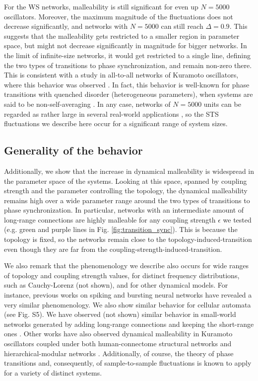 For the WS networks, malleability is still significant for even up $N = 5000$ oscillators. Moreover, the maximum magnitude of the fluctuations does not decrease significantly, and networks with $N = 5000$ can still reach $\Delta = 0.9$. This suggests that the malleability gets restricted to a smaller region in parameter space, but might not decrease significantly in magnitude for bigger networks. In the limit of infinite-size networks, it would get restricted to a single line, defining the two types of transitions to phase synchronization, and remain non-zero there. This is consistent with a study in all-to-all networks of Kuramoto oscillators, where this behavior was observed \cite{hong2006anomalous}. In fact, this behavior is well-known for phase transitions with quenched disorder (heterogeneous parameters), when systems are said to be non-self-averaging \cite{wiseman1995lack}.  
In any case, networks of $N = 5000$ units can be regarded as rather large in several real-world applications \cite{peter2018transition}, so the STS fluctuations we describe here occur for a significant range of system sizes.

\subsection{Generality of the behavior}
Additionally, we show that the increase in dynamical malleability is widespread in the parameter space of the systems. Looking at this space, spanned by coupling strength and the parameter controlling the topology, the dynamical malleability remains high over a wide parameter range around the two types of transitions to phase synchronization. In particular, networks with an intermediate amount of long-range connections are highly malleable for any coupling strength $\epsilon$ we tested (e.g. green and purple lines in Fig. \ref{fig:transition_sync}). This is because the topology is fixed, so the networks remain close to the topology-induced-transition even though they are far from the coupling-strength-induced-transition. 

We also remark that the phenomenology we describe also occurs for wide ranges of topology and coupling strength values, for distinct frequency distributions, such as Cauchy-Lorenz (not shown), and for other dynamical models. For instance, previous works on spiking \cite{budzinski2020synchronization} and bursting \cite{budzinski2019synchronous} neural networks have revealed a very similar phenomenology. We also show similar behavior for cellular automata (see Fig. S5). We have observed (not shown) similar behavior in small-world networks generated by adding long-range connections and keeping the short-range ones \cite{newman1999scaling}. Other works have also observed dynamical malleability in Kuramoto oscillators coupled under both human-connectome structural networks and hierarchical-modular networks \cite{buendia2022the, villegas2014frustrated}. 
Additionally, of course, the theory of phase transitions and, consequently, of sample-to-sample fluctuations is known to apply for a variety of distinct systems. 

